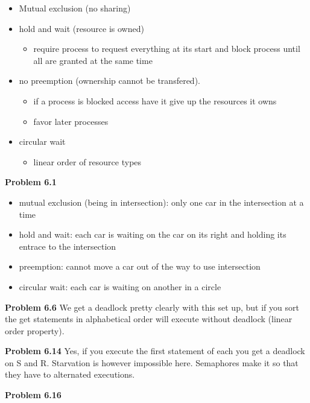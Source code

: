 \documentclass[24pt]{standalone}
\begin{document}
\begin{itemize}
    \item Mutual exclusion (no sharing)
    \item hold and wait (resource is owned)
    \begin{itemize}
        \item require process to request everything at its start and block process until all are granted at the same time
    \end{itemize}
    \item no preemption (ownership cannot be transfered).
    \begin{itemize}
        \item if a process is blocked access have it give up the resources it owns
        \item favor later processes
    \end{itemize}
    \item circular wait
    \begin{itemize}
        \item linear order of resource types
    \end{itemize}
\end{itemize}
\textbf{Problem 6.1}
\begin{itemize}
    \item mutual exclusion (being in intersection): only one car in the intersection at a time
    \item hold and wait: each car is waiting on the car on its right and holding its entrace to the intersection
    \item preemption: cannot move a car out of the way to use intersection
    \item circular wait: each car is waiting on another in a circle
\end{itemize}

\textbf{Problem 6.6}
We get a deadlock pretty clearly with this set up, but if you sort the get statements in alphabetical order will execute without deadlock (linear order property).

\textbf{Problem 6.14}
Yes, if you execute the first statement of each you get a deadlock on S and R. Starvation is however impossible here. Semaphores make it so that they have to alternated executions.

\textbf{Problem 6.16}
\end{document}
